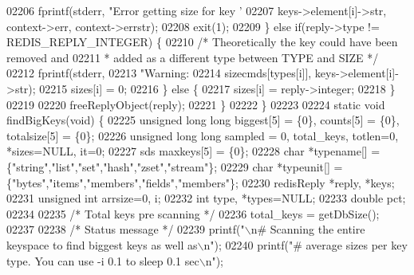 \begin{DoxyCode}
{{{{{{{{{{{{{{{{{{{{{{{{{{{{{{{{{{{{{{{{{{{{{{{{{{{{{{{{{{{{{{{{{{{02206             fprintf(stderr, \textcolor{stringliteral}{"Error getting size for key '%
02207                 keys->element[i]->str, context->err, context->errstr);
02208             exit(1);
02209         \} \textcolor{keywordflow}{else} \textcolor{keywordflow}{if}(reply->type != REDIS\_REPLY\_INTEGER) \{
02210             \textcolor{comment}{/* Theoretically the key could have been removed and}
02211 \textcolor{comment}{             * added as a different type between TYPE and SIZE */}
02212             fprintf(stderr,
02213                 \textcolor{stringliteral}{"Warning:  %
02214                  sizecmds[types[i]], keys->element[i]->str);
02215             sizes[i] = 0;
02216         \} \textcolor{keywordflow}{else} \{
02217             sizes[i] = reply->integer;
02218         \}
02219 
02220         freeReplyObject(reply);
02221     \}
02222 \}
02223 
02224 \textcolor{keyword}{static} \textcolor{keywordtype}{void} findBigKeys(\textcolor{keywordtype}{void}) \{
02225     \textcolor{keywordtype}{unsigned} \textcolor{keywordtype}{long} \textcolor{keywordtype}{long} biggest[5] = \{0\}, counts[5] = \{0\}, totalsize[5] = \{0\};
02226     \textcolor{keywordtype}{unsigned} \textcolor{keywordtype}{long} \textcolor{keywordtype}{long} sampled = 0, total\_keys, totlen=0, *sizes=NULL, it=0;
02227     sds maxkeys[5] = \{0\};
02228     \textcolor{keywordtype}{char} *\textcolor{keyword}{typename}[] = \{\textcolor{stringliteral}{"string"},\textcolor{stringliteral}{"list"},\textcolor{stringliteral}{"set"},\textcolor{stringliteral}{"hash"},\textcolor{stringliteral}{"zset"},\textcolor{stringliteral}{"stream"}\};
02229     \textcolor{keywordtype}{char} *typeunit[] = \{\textcolor{stringliteral}{"bytes"},\textcolor{stringliteral}{"items"},\textcolor{stringliteral}{"members"},\textcolor{stringliteral}{"fields"},\textcolor{stringliteral}{"members"}\};
02230     redisReply *reply, *keys;
02231     \textcolor{keywordtype}{unsigned} \textcolor{keywordtype}{int} arrsize=0, i;
02232     \textcolor{keywordtype}{int} type, *types=NULL;
02233     \textcolor{keywordtype}{double} pct;
02234 
02235     \textcolor{comment}{/* Total keys pre scanning */}
02236     total\_keys = getDbSize();
02237 
02238     \textcolor{comment}{/* Status message */}
02239     printf(\textcolor{stringliteral}{"\(\backslash\)n# Scanning the entire keyspace to find biggest keys as well as\(\backslash\)n"});
02240     printf(\textcolor{stringliteral}{"# average sizes per key type.  You can use -i 0.1 to sleep 0.1 sec\(\backslash\)n"});
}}}}}}}}}}}}}}}}}}}}}}}}}}}}}}}}}}}}}}}}}}}}}}}}}}}}}}}}}}}}}}}}}}}}}
\end{DoxyCode}
